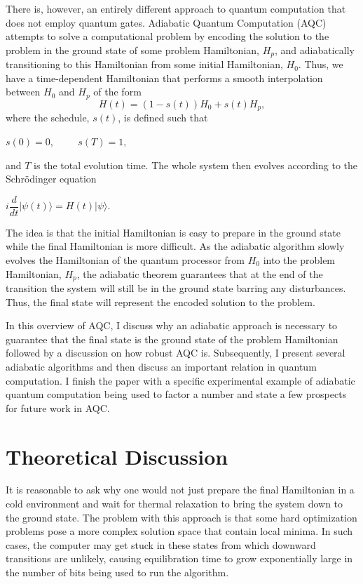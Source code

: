 \documentclass[%
 reprint,
 amsmath,amssymb,
 aps,
]{revtex4-1}
\begin{document}
   There is, however, an entirely different approach to quantum computation that does not employ quantum gates. Adiabatic Quantum Computation (AQC) attempts to solve a computational problem by encoding the solution to the problem in the ground state of some problem Hamiltonian, $H_p$, and adiabatically transitioning to this Hamiltonian from some initial Hamiltonian, $H_0$\cite{RevModPhys.90.015002}. Thus, we have a time-dependent Hamiltonian that performs a smooth interpolation between $H_0$ and $H_p$ of the form 
	\begin{equation}
		H(t) = (1-s(t))H_0 + s(t)H_p, 
		\label{eq:Ht}
	\end{equation}
where the schedule, $s(t)$, is defined such that
	\begin{center}
		$s(0) = 0, \hspace{1cm} s(T) = 1,$
	\end{center}
and $T$ is the total evolution time. The whole system then evolves according to the Schr{\"o}dinger equation
 	\begin{center}
		$i\dfrac{d}{dt}\vert\psi(t)\rangle = H(t)\vert\psi\rangle$.
	\end{center}
	
   The idea is that the initial Hamiltonian is easy to prepare in the ground state while the final Hamiltonian is more difficult. As the adiabatic algorithm slowly evolves the Hamiltonian of the quantum processor from $H_0$ into the problem Hamiltonian, $H_p$, the adiabatic theorem guarantees that at the end of the transition the system will still be in the ground state barring any disturbances. Thus, the final state will represent the encoded solution to the problem. 

   In this overview of AQC, I discuss why an adiabatic approach is necessary to guarantee that the final state is the ground state of the problem Hamiltonian followed by a discussion on how robust AQC is. Subsequently, I present several adiabatic algorithms and then discuss an important relation in quantum computation. I finish the paper with a specific experimental example of adiabatic quantum computation being used to factor a number and state a few prospects for future work in AQC.
   
   \section{Theoretical Discussion}\label{sec:A}
   
   It is reasonable to ask why one would not just prepare the final Hamiltonian in a cold environment and wait for thermal relaxation to bring the system down to the ground state. The problem with this approach is that some hard optimization problems pose a more complex solution space that contain local minima. In such cases, the computer may get stuck in these states from which downward transitions are unlikely, causing equilibration time to grow exponentially large in the number of bits being used to run the algorithm.
   
\end{document}
